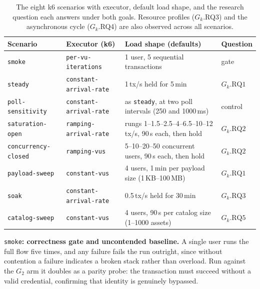 \begin{table}[ht]
    \centering
    \small
    \setlength{\tabcolsep}{3.5pt}
    \begin{tabularx}{\textwidth}{@{}l >{\raggedright\arraybackslash}p{3.35cm} X l@{}}
        \toprule
        \textbf{Scenario} & \textbf{Executor (k6)} & \textbf{Load shape (defaults)} & \textbf{Question} \\
        \midrule
        \texttt{smoke} & \texttt{per-vu-\allowbreak iterations} & 1 user, 5 sequential transactions & gate \\
        \texttt{steady} & \texttt{constant-\allowbreak arrival-\allowbreak rate} & 1\,tx/s held for 5\,min & $G_k.\text{RQ}1$ \\
        \texttt{poll-sensitivity} & \texttt{constant-\allowbreak arrival-\allowbreak rate} & as \texttt{steady}, at two poll intervals (250 and 1000\,ms) & control \\
        \texttt{saturation-open} & \texttt{ramping-\allowbreak arrival-\allowbreak rate} & rungs 1--1.5--2.5--4--6.5--10--12\,tx/s, 90\,s each, then hold & $G_k.\text{RQ}2$ \\
        \texttt{concurrency-closed} & \texttt{ramping-vus} & 5--10--20--50 concurrent users, 90\,s each, then hold & $G_k.\text{RQ}2$ \\
        \texttt{payload-sweep} & \texttt{constant-vus} & 4 users, 1\,min per payload size (1\,KB--100\,MB) & $G_k.\text{RQ}1$ \\
        \texttt{soak} & \texttt{constant-\allowbreak arrival-\allowbreak rate} & 0.5\,tx/s held for 30\,min & $G_k.\text{RQ}3$ \\
        \texttt{catalog-sweep} & \texttt{constant-vus} & 4 users, 90\,s per catalog size (1--1000 assets) & $G_k.\text{RQ}5$ \\
        \bottomrule
    \end{tabularx}
    \caption[Benchmark scenarios and their research questions]{The eight k6 scenarios with executor, default load shape, and the research question each answers under both goals. Resource profiles ($G_k.$RQ3) and the asynchronous cycle ($G_k.$RQ4) are also observed across all scenarios.}
    \label{tab:k6-scenarios}
\end{table}

\texttt{smoke}\textbf{: correctness gate and uncontended baseline.} A single user runs the full flow five times, and any failure fails the run outright, since without contention a failure indicates a broken stack rather than overload. Run against the $G_2$ arm it doubles as a parity probe: the transaction must succeed without a valid credential, confirming that identity is genuinely bypassed.

